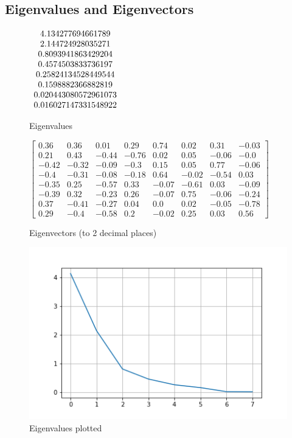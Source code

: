 \documentclass[a4paper,12pt]{article}
\begin{document}
    \subsection{Eigenvalues and Eigenvectors}

    \setcounter{MaxMatrixCols}{20}
    \begin{figure}[h]
        \centering
        \begin{math}
            \begin{array}{c}
                4.134277694661789\cr2.144724928035271\cr0.8093941863429204\cr0.4574503833736197\cr0.25824134528449544\cr0.1598882366882819\cr0.020443080572961073\cr0.016027147331548922
            \end{array}
        \end{math}
        \caption{Eigenvalues}
    \end{figure}

    \setcounter{MaxMatrixCols}{20}
    \begin{figure}[h]
        \centering
        \begin{math}
            \begin{bmatrix}
                0.36&0.36&0.01&0.29&0.74&0.02&0.31&-0.03\\
                0.21&0.43&-0.44&-0.76&0.02&0.05&-0.06&-0.0\\
                -0.42&-0.32&-0.09&-0.3&0.15&0.05&0.77&-0.06\\
                -0.4&-0.31&-0.08&-0.18&0.64&-0.02&-0.54&0.03\\
                -0.35&0.25&-0.57&0.33&-0.07&-0.61&0.03&-0.09\\
                -0.39&0.32&-0.23&0.26&-0.07&0.75&-0.06&-0.24\\
                0.37&-0.41&-0.27&0.04&0.0&0.02&-0.05&-0.78\\
                0.29&-0.4&-0.58&0.2&-0.02&0.25&0.03&0.56
            \end{bmatrix}
        \end{math}
        \caption{Eigenvectors (to 2 decimal places)}
    \end{figure}

    \begin{figure}[ht!]
        \centering
        \includegraphics[clip, trim = 0 0 0 1cm, width=.75\textwidth]{eigen}
        \caption{Eigenvalues plotted}
        \label{fig:eigenvalues-plot}
    \end{figure}
\end{document}
